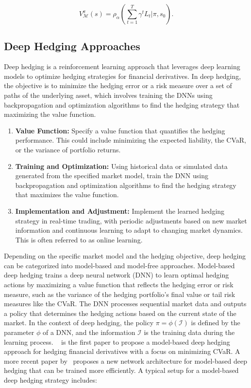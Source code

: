 \begin{equation}
    V^{\pi}_{\mathcal{M}}(s) = \rho_{\alpha}(\sum_{t=1}^{T} \gamma^t L_t | \pi, s_0).
\end{equation}

\subsection{Deep Hedging Approaches}

Deep hedging is a reinforcement learning approach that leverages deep learning models to optimize hedging strategies for financial derivatives.
In deep hedging, the objective is to minimize the hedging error or a risk measure over a set of paths of the underlying asset, which involves training the DNNs using backpropagation and optimization algorithms to find the hedging strategy that maximizing the value function.

\begin{enumerate}
    \item \textbf{Value Function:} Specify a value function that quantifies the hedging performance. 
    This could include minimizing the expected liability, the CVaR, or the variance of portfolio returns.
    \item \textbf{Training and Optimization:} Using historical data or simulated data generated from the specified market model, train the DNN using backpropagation and optimization algorithms to find the hedging strategy that maximizes the value function.
    \item \textbf{Implementation and Adjustment:} Implement the learned hedging strategy in real-time trading, with periodic adjustments based on new market information and continuous learning to adapt to changing market dynamics. This is often referred to as online learning.
\end{enumerate}

Depending on the specific market model and the hedging objective, deep hedging can be categorized into model-based and model-free approaches.
Model-based deep hedging trains a deep neural network (DNN) to learn optimal hedging actions by maximizing a value function that reflects the hedging error or risk measure, such as the variance of the hedging portfolio's final value or tail risk measures like the CVaR.
The DNN processes sequential market data and outputs a policy that determines the hedging actions based on the current state of the market.
In the context of deep hedging, the policy $\pi = \phi(\mathcal{I})$ is defined by the parameter $\phi$ of a DNN, and the information $\mathcal{I}$ is the training data during the learning process.
~\cite{buehler2019deep} is the first paper to propose a model-based deep hedging approach for hedging financial derivatives with a focus on minimizing CVaR.
A more recent paper by~\cite{imaki2021no} proposes a new network architecture for model-based deep hedging that can be trained more efficiently.
A typical setup for a model-based deep hedging strategy includes:

